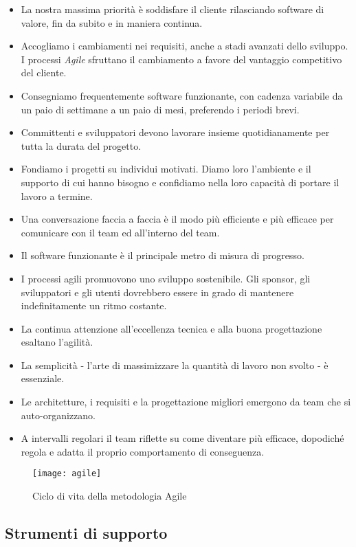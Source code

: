 \begin{itemize}
	\item La nostra massima priorità è soddisfare il cliente
	rilasciando software di valore, fin da subito
	e in maniera continua. 
	\item Accogliamo i cambiamenti nei requisiti,
	anche a stadi avanzati dello sviluppo.
	I processi \textit{Agile} sfruttano il cambiamento
	a favore del vantaggio competitivo del cliente. 
	\item Consegniamo frequentemente software funzionante,
	con cadenza variabile da un paio di settimane a un paio di mesi,
	preferendo i periodi brevi. 
	\item Committenti e sviluppatori devono lavorare insieme
	quotidianamente per tutta la durata del progetto. 
	\item Fondiamo i progetti su individui motivati.
	Diamo loro l'ambiente e il supporto di cui hanno bisogno
	e confidiamo nella loro capacità di portare il lavoro a termine. 
	\item Una conversazione faccia a faccia
	è il modo più efficiente e più efficace per comunicare
	con il team ed all'interno del team. 
	\item Il software funzionante è il principale metro di misura di progresso. 
	\item I processi agili promuovono uno sviluppo sostenibile.
	Gli sponsor, gli sviluppatori e gli utenti dovrebbero essere in grado
	di mantenere indefinitamente un ritmo costante. 
	\item La continua attenzione all'eccellenza tecnica
	e alla buona progettazione esaltano l'agilità. 
	\item La semplicità - l'arte di massimizzare la quantità
	di lavoro non svolto - è essenziale. 
	\item Le architetture, i requisiti e la progettazione
	migliori emergono da team che si auto-organizzano. 
	\item A intervalli regolari il team riflette su come
	diventare più efficace, dopodiché regola e adatta
	il proprio comportamento di conseguenza. 
\end{itemize}
\begin{figure}[!h] 
	\centering 
	\texttt{[image: agile]} 
	\caption{Ciclo di vita della metodologia Agile}
\end{figure}
\subsection{Strumenti di supporto}
